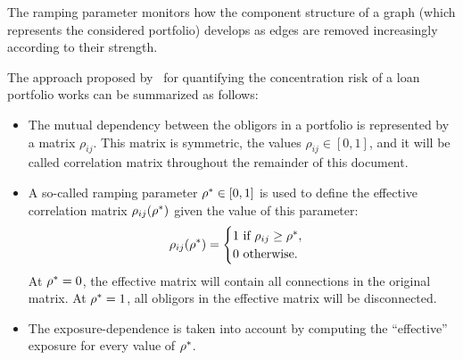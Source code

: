 \documentclass[12pt,beltcrest]{ociamthesis} %
\begin{document}
The ramping parameter monitors how the component structure of a graph (which represents the considered portfolio) develops as edges are removed increasingly according to their strength.



The approach proposed by~\cite{Sindel:2009vd} for quantifying the concentration risk of a loan portfolio works can be summarized as follows:
\begin{itemize}
	\item The mutual dependency between the obligors in a portfolio is represented by a matrix $\rho_{ij}$. This matrix is symmetric, the values $\rho_{ij} \in [0,1]$, and it will be called correlation matrix throughout the remainder of this document.
	\item A so-called ramping parameter $\rho^* \in [0,1]$ is used to define the effective correlation matrix $\rho_{ij}(\rho^*)$ given the value of this  parameter:
	\begin{equation}
	\rho_{ij}(\rho^*) = 
		\begin{cases}
		1 \text{ if } \rho_{ij} \ge \rho^*,\\
		0 \text{ otherwise}.
		\end{cases}
	\end{equation}
	At $\rho^* = 0$, the effective matrix will contain all connections in the original matrix. At $\rho^* = 1$, all obligors in the effective matrix will be disconnected.
	
	\item The exposure-dependence is taken into account by computing the “effective” exposure for every value of $\rho^*$.
\end{itemize}
\end{document}
